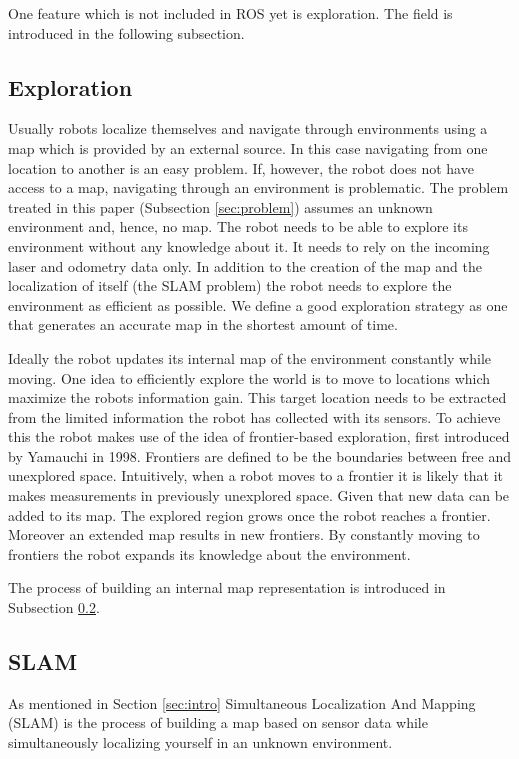 \documentclass{ba-kecs}
\begin{document}
One feature which is not included in ROS yet is exploration. The field is introduced in the following subsection.

\subsection{Exploration}
\label{subsec:sotaExplore}
Usually robots localize themselves and navigate through environments using a map which is provided by an external source. In this case navigating from one location to another is an easy problem. If, however, the robot does not have access to a map, navigating through an environment is problematic. The problem treated in this paper (Subsection \ref{sec:problem}) assumes an unknown environment and, hence, no map. The robot needs to be able to explore its environment without any knowledge about it. It needs to rely on the incoming laser and odometry data only. In addition to the creation of the map and the localization of itself (the SLAM problem) the robot needs to explore the environment as efficient as possible. We define a good exploration strategy as one that generates an accurate map in the shortest amount of time.

Ideally the robot updates its internal map of the environment constantly while moving. One idea to efficiently explore the world is to move to locations which maximize the robots information gain. This target location needs to be extracted from the limited information the robot has collected with its sensors.
To achieve this the robot makes use of the idea of frontier-based exploration, first introduced by Yamauchi \cite{Yamauchi} in 1998. Frontiers are defined to be the boundaries between free and unexplored space. Intuitively, when a robot moves to a frontier it is likely that it makes measurements in previously unexplored space. Given that new data can be added to its map. The explored region grows once the robot reaches a frontier. Moreover an extended map results in new frontiers. By constantly moving to frontiers the robot expands its knowledge about the environment.

The process of building an internal map representation is introduced in Subsection \ref{subsec:sotaSlam}.

\subsection{SLAM}
\label{subsec:sotaSlam}
As mentioned in Section \ref{sec:intro} Simultaneous Localization And Mapping (SLAM) is the process of building a map based on sensor data while simultaneously localizing yourself in an unknown environment.
\end{document}
